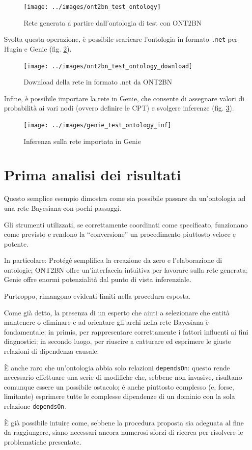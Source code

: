 \begin{figure}[H]
	\centering
	\texttt{[image: ../images/ont2bn\_test\_ontology]}
	\caption{Rete generata a partire dall'ontologia di test con ONT2BN}
	\label{fig:ont2bntestontology}
\end{figure}

Svolta questa operazione, è possibile scaricare l'ontologia in formato \texttt{.net} per Hugin e Genie (fig. \ref{fig:ont2bntestontologydownload}).


\begin{figure}[H]
	\centering
	\texttt{[image: ../images/ont2bn\_test\_ontology\_download]}
	\caption{Download della rete in formato .net da ONT2BN}
	\label{fig:ont2bntestontologydownload}
\end{figure}

Infine, è possibile importare la rete in Genie, che consente di assegnare valori di probabilità ai vari nodi (ovvero definire le CPT) e svolgere inferenze (fig. \ref{fig:genietestontologyinf}).

\begin{figure}[H]
	\centering
	\texttt{[image: ../images/genie\_test\_ontology\_inf]}
	\caption{Inferenza sulla rete importata in Genie}
	\label{fig:genietestontologyinf}
\end{figure}


\section{Prima analisi dei risultati}
Questo semplice esempio dimostra come sia possibile passare da un'ontologia ad una rete Bayesiana con pochi passaggi. 

Gli strumenti utilizzati, se correttamente coordinati come specificato, funzionano come previsto e rendono la ``conversione'' un procedimento piuttosto veloce e potente. 

In particolare: Protégé semplifica la creazione da zero e l'elaborazione di ontologie; ONT2BN offre un'interfaccia intuitiva per lavorare sulla rete generata; Genie offre enormi potenzialità dal punto di vista inferenziale.

Purtroppo, rimangono evidenti limiti nella procedura esposta.

Come già detto, la presenza di un esperto che aiuti a selezionare che entità mantenere o eliminare e ad orientare gli archi nella rete Bayesiana è fondamentale: in primis, per rappresentare correttamente i fattori influenti ai fini diagnostici; in secondo luogo, per riuscire a catturare ed esprimere le giuste relazioni di dipendenza causale. 

È anche raro che un'ontologia abbia solo relazioni \texttt{dependsOn}: questo rende necessario effettuare una serie di modifiche che, sebbene non invasive, risultano comunque essere un possibile ostacolo; è anche piuttosto complesso (e, forse, limitante) esprimere tutte le complesse dipendenze di un dominio con la sola relazione \texttt{dependsOn}. 

È già possibile intuire come, sebbene la procedura proposta sia adeguata al fine da raggiungere, siano necessari ancora numerosi sforzi di ricerca per risolvere le problematiche presentate.